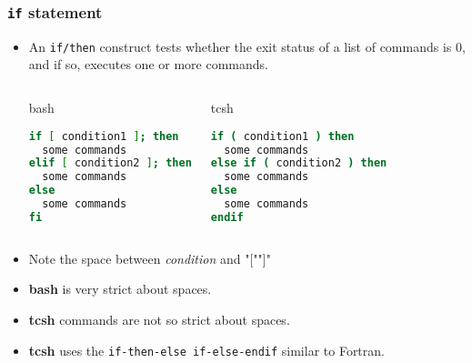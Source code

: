 \documentclass[10pt,t]{beamer}
\begin{document}
\begin{frame}[fragile]
  \frametitle{\texttt{if} statement}
  \begin{itemize}
    \item An \texttt{if/then} construct tests whether the exit status of a list of commands is 0, and if so, executes one or more commands.
    \begin{columns}
      \column{5cm}
      \begin{exampleblock}{bash}
        \begin{lstlisting}[language=bash]
if [ condition1 ]; then
  some commands
elif [ condition2 ]; then
  some commands
else
  some commands
fi
        \end{lstlisting}
      \end{exampleblock}
      \column{5cm}
      \begin{block}{tcsh}
        \begin{lstlisting}[language=csh]
if ( condition1 ) then
  some commands
else if ( condition2 ) then
  some commands
else
  some commands
endif
        \end{lstlisting}
      \end{block}
    \end{columns}
  \item Note the space between \textit{condition} and "["\quad"]"
  \item \textbf{bash} is very strict about spaces.
  \item \textbf{tcsh} commands are not so strict about spaces.
  \item \textbf{tcsh} uses the \texttt{if-then-else if-else-endif} similar to Fortran.   
  \end{itemize}
\end{frame}
\end{document}
